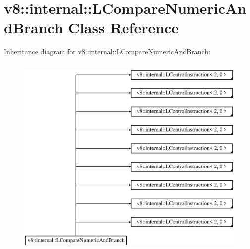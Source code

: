 \hypertarget{classv8_1_1internal_1_1_l_compare_numeric_and_branch}{}\section{v8\+:\+:internal\+:\+:L\+Compare\+Numeric\+And\+Branch Class Reference}
\label{classv8_1_1internal_1_1_l_compare_numeric_and_branch}
Inheritance diagram for v8\+:\+:internal\+:\+:L\+Compare\+Numeric\+And\+Branch\+:\begin{figure}[H]
\begin{center}
\leavevmode
\includegraphics[height=10.000000cm]{classv8_1_1internal_1_1_l_compare_numeric_and_branch}
\end{center}
\end{figure}
